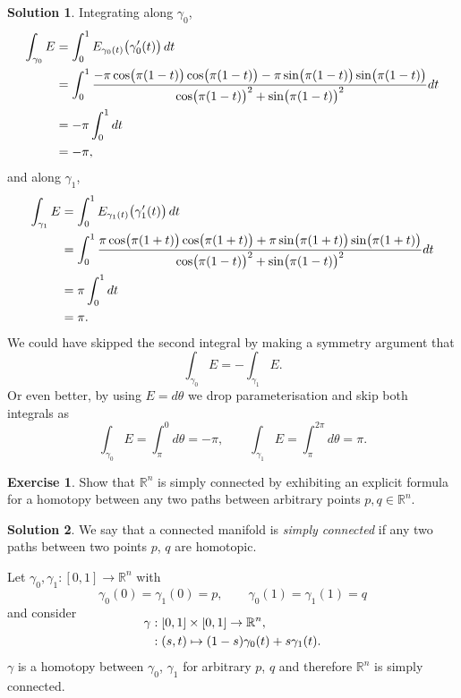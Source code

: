 \documentclass[11pt, a4paper]{report}
\theoremstyle{definition}
\newtheorem{exercise}{Exercise}[part]
\newtheorem{solution}{Solution}[part]
\newenvironment{ex}{\begin{exercise}}{\end{exercise}\pagebreak[1]}
\newenvironment{sol}{\begin{solution}}{\end{solution}\pagebreak[3]}
\newcommand*{\op}[1]{\ensuremath\mathop{}\mathopen{}#1}
\renewcommand*{\d}{\op{d}}
\begin{document}
\begin{sol}
Integrating along $\gamma_0$,
\begin{align*}
    \int_{\gamma_0} E &= \int_0^1 E_{\gamma_0(t)} \bigl(\gamma_0'(t) \bigr) \d t \\
        &= \int_0^1 \frac{-\pi \cos \bigl( \pi(1 - t) \bigr) \cos \bigl( \pi(1 - t) \bigr)
                          - \pi \sin \bigl( \pi(1 - t) \bigr) \sin \bigl( \pi(1 - t) \bigr)}
                         {{\cos \bigl( \pi(1 - t) \bigr)}^2 + {\sin \bigl( \pi(1 - t) \bigr)}^2} dt \\
        &= -\pi \int_0^1 dt \\
        &= -\pi,
\end{align*}
and along $\gamma_1$,
\begin{align*}
    \int_{\gamma_1} E &= \int_0^1 E_{\gamma_1(t)} \bigl(\gamma_1'(t) \bigr) \d t \\
        &= \int_0^1 \frac{\pi \cos \bigl( \pi(1 + t) \bigr) \cos \bigl( \pi(1 + t) \bigr)
                          + \pi \sin \bigl( \pi(1 + t) \bigr) \sin \bigl( \pi(1 + t) \bigr)}
                         {{\cos \bigl( \pi(1 - t) \bigr)}^2 + {\sin \bigl( \pi(1 - t) \bigr)}^2} dt \\
        &= \pi \int_0^1 dt \\
        &= \pi.
\end{align*}
We could have skipped the second integral by making a symmetry argument that
\[
    \int_{\gamma_0} E = -\int_{\gamma_1} E.
\]
Or even better, by using $E = d\theta$ we drop parameterisation and skip both integrals as
\[
    \int_{\gamma_0} E = \int_\pi^0 d\theta = -\pi, \qquad
    \int_{\gamma_1} E = \int_\pi^{2\pi} d\theta = \pi.
\]

\end{sol}

\begin{ex}

Show that $\mathbb{R}^n$ is simply connected by exhibiting an explicit formula for a homotopy between any two paths between arbitrary points $p, q \in \mathbb{R}^n$.

\end{ex}

\begin{sol}

We say that a connected manifold is \emph{simply connected} if any two paths between two points $p$, $q$ are homotopic.

Let $\gamma_0, \gamma_1: [0, 1] \to \mathbb{R}^n$ with
\[
    \gamma_0(0) = \gamma_1(0) = p, \qquad
    \gamma_0(1) = \gamma_1(1) = q
\]
and consider
\begin{align*}
    \SwapAboveDisplaySkip
    \gamma &: [0, 1] \times [0, 1] \to \mathbb{R}^n, \\
           &: (s, t) \mapsto (1 - s)\gamma_0(t) + s \gamma_1(t).
\end{align*}
$\gamma$ is a homotopy between $\gamma_0$, $\gamma_1$ for arbitrary $p$, $q$ and therefore $\mathbb{R}^n$ is simply connected.

\end{sol}
\end{document}
